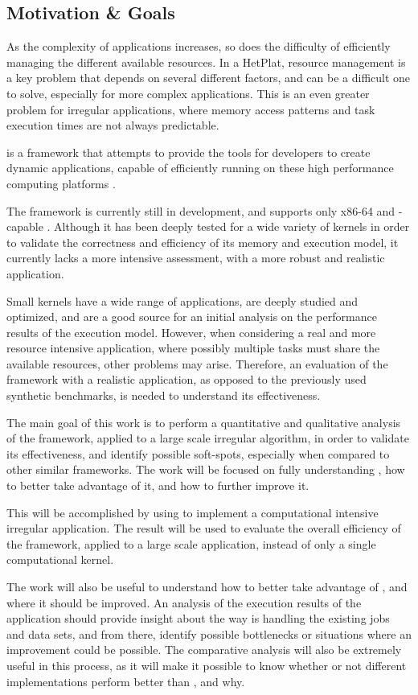 \documentclass[main.tex]{subfiles}
\begin{document}
\subsection{Motivation \& Goals}

As the complexity of applications increases, so does the difficulty of efficiently managing the different available resources. In a \ac{HetPlat}, resource management is a key problem that depends on several different factors, and can be a difficult one to solve, especially for more complex applications. This is an even greater problem for irregular applications, where memory access patterns and task execution times are not always predictable.

\gama is a framework that attempts to provide the tools for developers to create dynamic applications, capable of efficiently running on these high performance computing platforms \cite{joao2012gama}.

The \gama framework is currently still in development, and supports only x86-64 \cpus and \cuda-capable \gpus. Although it has been deeply tested for a wide variety of kernels in order to validate the correctness and efficiency of its memory and execution model, it currently lacks a more intensive assessment, with a more robust and realistic application.

Small kernels have a wide range of applications, are deeply studied and optimized, and are a good source for an initial analysis on the performance results of the execution model. However, when considering a real and more resource intensive application, where possibly multiple tasks must share the available resources, other problems may arise. Therefore, an evaluation of the framework with a realistic application, as opposed to the previously used synthetic benchmarks, is needed to understand its effectiveness.

The main goal of this work is to perform a quantitative and qualitative analysis of the \gama framework, applied to a large scale irregular algorithm, in order to validate its effectiveness, and identify possible soft-spots, especially when compared to other similar frameworks. The work will be focused on fully understanding \gama, how to better take advantage of it, and how to further improve it.

This will be accomplished by using \gama to implement a computational intensive irregular application. The result will be used to evaluate the overall efficiency of the \gama framework, applied to a large scale application, instead of only a single computational kernel.

The work will also be useful to understand how to better take advantage of \gama, and where it should be improved. An analysis of the execution results of the application should provide insight about the way \gama is handling the existing jobs and data sets, and from there, identify possible bottlenecks or situations where an improvement could be possible. The comparative analysis will also be extremely useful in this process, as it will make it possible to know whether or not different implementations perform better than \gama, and why.
\end{document}

